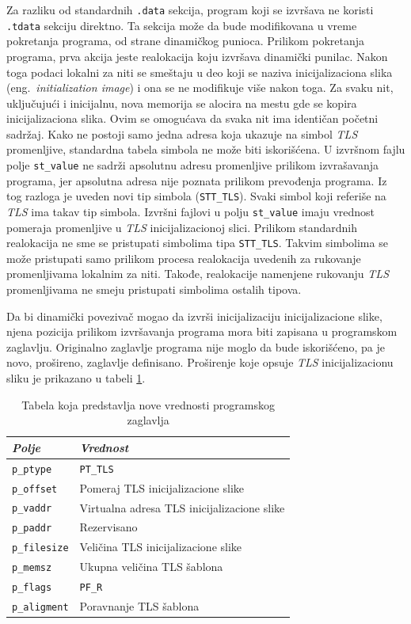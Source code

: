 \documentclass[12pt,oneside]{memoir}
\begin{document}
Za razliku od standardnih \texttt{.data} sekcija, program koji se izvršava ne koristi \texttt{.tdata} sekciju direktno.  Ta sekcija može da bude modifikovana u vreme pokretanja programa, od strane dinamičkog punioca. Prilikom pokretanja programa, prva akcija jeste realokacija koju izvršava dinamički punilac. Nakon toga podaci lokalni za niti se smeštaju u deo koji se naziva inicijalizaciona slika (eng.~\emph{initialization image}) i ona se ne modifikuje više nakon toga. Za svaku nit, uključujući i inicijalnu, nova memorija se alocira na mestu gde se kopira inicijalizaciona slika. Ovim se omogućava da svaka nit ima identičan početni sadržaj. Kako ne postoji samo jedna adresa koja ukazuje na simbol \emph{TLS} promenljive, standardna tabela simbola ne može biti iskorišćena. U izvršnom fajlu polje \texttt{st\_value} ne sadrži apsolutnu adresu promenljive prilikom izvrašavanja programa, jer apsolutna adresa nije poznata prilikom prevođenja programa. Iz tog razloga  je uveden novi tip simbola (\texttt{STT\_TLS}). Svaki simbol koji referiše na \emph{TLS} ima takav tip simbola. Izvršni fajlovi u polju \texttt{st\_value} imaju vrednost pomeraja promenljive u \emph{TLS} inicijalizacionoj slici.
Prilikom standardnih realokacija ne sme se pristupati simbolima tipa \texttt{STT\_TLS}. Takvim simbolima se može pristupati samo prilikom procesa realokacija uvedenih za rukovanje promenljivama lokalnim za niti. Takođe, realokacije namenjene rukovanju \emph{TLS} promenljivama ne smeju pristupati simbolima ostalih tipova.

Da bi dinamički povezivač mogao da izvrši inicijalizaciju inicijalizacione slike, njena pozicija prilikom izvršavanja programa mora biti zapisana u programskom zaglavlju. Originalno zaglavlje programa nije moglo da bude iskorišćeno, pa je novo, prošireno, zaglavlje definisano. Proširenje koje opsuje \emph{TLS} inicijalizacionu sliku je prikazano u tabeli \ref{tab:tls_prheader}.

\begin{table}
		\begin{center}
		\begin{tabular}{ | l | l |}
			\hline
			\emph{Polje} & \emph{Vrednost} \\ \hline
			\texttt{p\_ptype} & \texttt{PT\_TLS} \\ \hline
			\texttt{p\_offset} & Pomeraj TLS inicijalizacione slike  \\ \hline
			\texttt{p\_vaddr} & Virtualna adresa TLS inicijalizacione slike  \\ \hline
			\texttt{p\_paddr} & Rezervisano  \\ \hline
			\texttt{p\_filesize} & Veličina TLS inicijalizacione slike  \\ \hline
			\texttt{p\_memsz} & Ukupna veličina TLS šablona  \\ \hline
			\texttt{p\_flags} & \texttt{PF\_R}  \\ \hline
			\texttt{p\_aligment} & Poravnanje TLS šablona  \\ \hline
		\end{tabular}
	   \end{center}
		\caption{\label{tab:tls_prheader}Tabela koja predstavlja nove vrednosti programskog zaglavlja}
\end{table}
\end{document}

